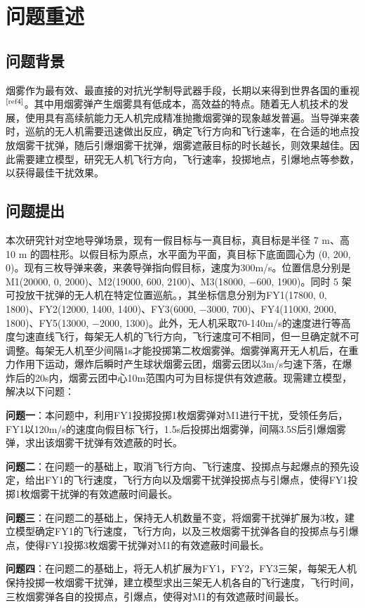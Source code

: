 \documentclass[withoutpreface]{cumcmthesis}
\begin{document}
\section{问题重述}
\subsection{问题背景}
烟雾作为最有效、最直接的对抗光学制导武器手段，长期以来得到世界各国的重视$^\text{\cite{ref4}}$。其中用烟雾弹产生烟雾具有低成本，高效益的特点。随着无人机技术的发展，使用具有高续航能力无人机完成精准抛撒烟雾弹的现象越发普遍。当导弹来袭时，巡航的无人机需要迅速做出反应，确定飞行方向和飞行速率，在合适的地点投放烟雾干扰弹，随后引爆烟雾干扰弹，烟雾遮蔽目标的时长越长，则效果越佳。因此需要建立模型，研究无人机飞行方向，飞行速率，投掷地点，引爆地点等参数，以获得最佳干扰效果。
\subsection{问题提出}
本次研究针对空地导弹场景，现有一假目标与一真目标，真目标是半径 7 m、高 10 m 的圆柱形。以假目标为原点，水平面为平面，真目标下底面圆心为 (0, 200, 0)。现有三枚导弹来袭，来袭导弹指向假目标，速度为300m/s。位置信息分别是M1(20000, 0, 2000)、M2(19000, 600, 2100)、M3(18000, −600, 1900)。同时 5 架可投放干扰弹的无人机在特定位置巡航。，其坐标信息分别为FY1(17800, 0, 1800)、FY2(12000, 1400, 1400)、FY3(6000, −3000, 700)、FY4(11000, 2000, 1800)、FY5(13000, −2000, 1300)。此外，无人机采取70-140m/s的速度进行等高度匀速直线飞行，每架无人机的飞行方向，飞行速度可不相同，但一旦确定就不可调整。每架无人机至少间隔1s才能投掷第二枚烟雾弹。烟雾弹离开无人机后，在重力作用下运动，爆炸后瞬时产生球状烟雾云团，烟雾云团以3m/s匀速下落，在爆炸后的20s内，烟雾云团中心10m范围内可为目标提供有效遮蔽。现需建立模型，解决以下问题：
    
\textbf{问题一}：本问题中，利用FY1投掷投掷1枚烟雾弹对M1进行干扰，受领任务后，FY1以120m/s的速度向假目标飞行，1.5s后投掷出烟雾弹，间隔3.5S后引爆烟雾弹，求出该烟雾干扰弹有效遮蔽的时长。

\textbf{问题二}：在问题一的基础上，取消飞行方向、飞行速度、投掷点与起爆点的预先设定，给出FY1的飞行速度，飞行方向以及烟雾干扰弹投掷点与引爆点，使得FY1投掷1枚烟雾干扰弹的有效遮蔽时间最长。

\textbf{问题三}：在问题二的基础上，保持无人机数量不变，将烟雾干扰弹扩展为3枚，建立模型确定FY1的飞行速度，飞行方向，以及三枚烟雾干扰弹各自的投掷点与引爆点，使得FY1投掷3枚烟雾干扰弹对M1的有效遮蔽时间最长。

\textbf{问题四}：在问题二的基础上，将无人机扩展为FY1，FY2，FY3三架，每架无人机保持投掷一枚烟雾干扰弹，建立模型求出三架无人机各自的飞行速度，飞行时间，三枚烟雾弹各自的投掷点，引爆点，使得对M1的有效遮蔽时间最长。
\end{document}
